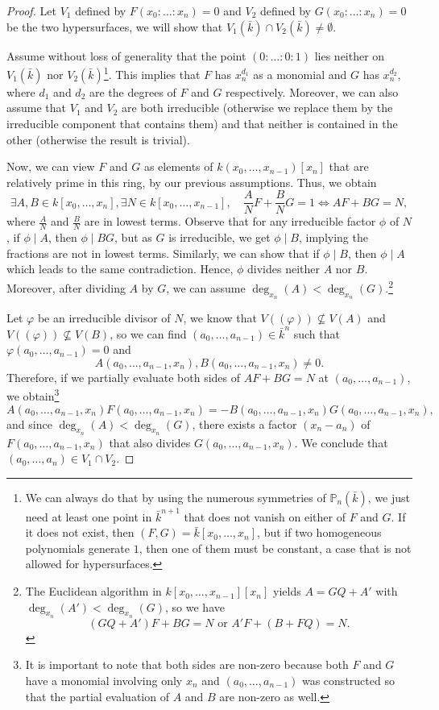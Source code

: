 \documentclass{tufte-handout} %
\theoremstyle{definition}
\theoremstyle{remark}
\renewcommand{\P}{\mathbb{P}}
\begin{document}
\begin{proof}
	Let $V_1$ defined by $F(x_0:\dots: x_n) = 0$ and $V_2$ defined by $G(x_0:\dots : x_n) = 0$ be the two hypersurfaces, we will show that $V_1(\bar{k}) \cap V_2(\bar{k}) \neq \emptyset$.
	
	Assume without loss of generality that the point $(0:\dots:0:1)$ lies neither on $V_1(\bar{k})$ nor $V_2(\bar{k})$\footnote{We can always do that by using the numerous symmetries of $\P_n(\bar{k})$, we just need at least one point in $\bar{k}^{n+1}$ that does not vanish on either of $F$ and $G$. If it does not exist, then $(F,G) = \bar{k}[x_0, \dots, x_n]$, but if two homogeneous polynomials generate $1$, then one of them must be constant, a case that is not allowed for hypersurfaces.}. This implies that $F$ has $x_n^{d_1}$ as a monomial and $G$ has $x_n^{d_2}$, where $d_1$ and $d_2$ are the degrees of $F$ and $G$ respectively. Moreover, we can also assume that $V_1$ and $V_2$ are both irreducible (otherwise we replace them by the irreducible component that contains them) and that neither is contained in the other (otherwise the result is trivial).
	
	Now, we can view $F$ and $G$ as elements of $k(x_0, \dots, x_{n-1})[x_n]$ that are relatively prime in this ring, by our previous assumptions. Thus, we obtain
	\[\exists A,B \in k[x_0, \dots, x_n],\exists N \in k[x_0, \dots, x_{n-1}],\quad \frac{A}{N}F + \frac{B}{N}G = 1\Leftrightarrow AF + BG = N,\]
	where $\frac{A}{N}$ and $\frac{B}{N}$ are in lowest terms. Observe that for any irreducible factor $\phi$ of $N$, if $\phi \mid A$, then $\phi \mid BG$, but as $G$ is irreducible, we get $\phi \mid B$, implying the fractions are not in lowest terms. Similarly, we can show that if $\phi \mid B$, then $\phi\mid A$ which leads to the same contradiction. Hence, $\phi$ divides neither $A$ nor $B$. Moreover, after dividing $A$ by $G$, we can assume $\deg_{x_n}(A) <\deg_{x_n}(G)$.\footnote{The Euclidean algorithm in $k[x_0, \dots, x_{n-1}][x_n]$ yields $A = GQ + A'$ with $\deg_{x_n}(A') < \deg_{x_n}(G)$, so we have
	\[(GQ+A')F+BG = N \text{ or } A'F+(B+FQ) = N.\]}
	
	Let $\varphi$ be an irreducible divisor of $N$, we know that $V((\varphi)) \nsubseteq V(A)$ and $V((\varphi)) \nsubseteq V(B)$, so we can find $(a_0, \dots, a_{n-1}) \in \bar{k}^n$ such that $\varphi(a_0, \dots, a_{n-1})= 0$ and \[A(a_0, \dots, a_{n-1},x_n), B(a_0, \dots, a_{n-1}, x_n) \neq 0.\]
	Therefore, if we partially evaluate both sides of $AF+BG = N$ at $(a_0, \dots, a_{n-1})$, we obtain\footnote{It is important to note that both sides are non-zero because both $F$ and $G$ have a monomial involving only $x_n$ and $(a_0, \dots, a_{n-1})$ was constructed so that the partial evaluation of $A$ and $B$ are non-zero as well.} \[A(a_0, \dots, a_{n-1}, x_n)F(a_0, \dots, a_{n-1},x_n) = -B(a_0, \dots, a_{n-1},x_n)G(a_0, \dots, a_{n-1},x_n),\] and since $\deg_{x_n}(A) < \deg_{x_n}(G)$, there exists a factor $(x_n-a_n)$ of $F(a_0, \dots, a_{n-1},x_n)$ that also divides $G(a_0, \dots, a_{n-1},x_n)$. We conclude that $(a_0, \dots, a_n) \in V_1 \cap V_2$. %
\end{proof}
\end{document}
